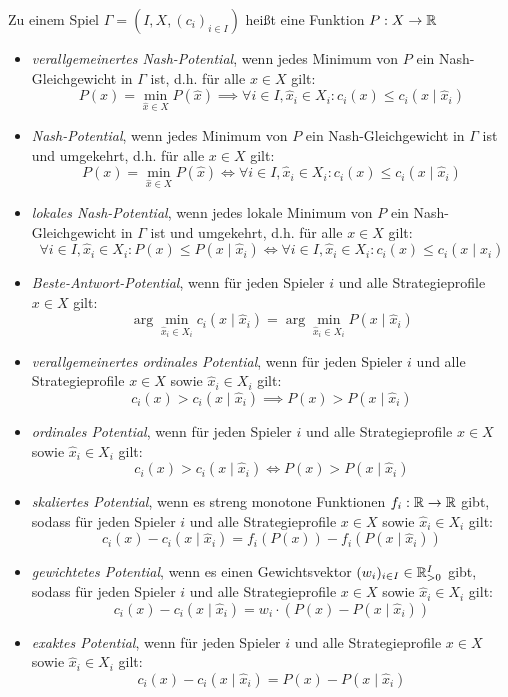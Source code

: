 \begin{defn}
	Zu einem Spiel $\Gamma = (I, X, (c_i)_{i\in I})$ heißt eine Funktion $P: X \to \mathbb{R}$
	\begin{itemize}
		\item \emph{verallgemeinertes Nash-Potential}, wenn jedes Minimum von $P$ ein Nash-Gleichgewicht in $\Gamma$ ist, d.h. für alle $x \in X$ gilt:
			\[P(x) = \min_{\hat{x} \in X}P(\hat{x}) \implies \forall i \in I, \hat{x}_i \in X_i: c_i(x) \leq c_i(x \mid \hat{x}_i) \]
		\item \emph{Nash-Potential}, wenn jedes Minimum von $P$ ein Nash-Gleichgewicht in $\Gamma$ ist und umgekehrt, d.h. für alle $x \in X$ gilt:
			\[P(x) = \min_{\hat{x} \in X}P(\hat{x}) \iff \forall i \in I, \hat{x}_i \in X_i: c_i(x) \leq c_i(x \mid \hat{x}_i) \]
		\item \emph{lokales Nash-Potential}, wenn jedes lokale Minimum von $P$ ein Nash-Gleichgewicht in $\Gamma$ ist und umgekehrt, d.h. für alle $x \in X$ gilt:
			\[\forall i \in I, \hat{x}_i \in X_i: P(x) \leq P(x \mid \hat{x}_i) \iff \forall i \in I, \hat{x}_i \in X_i: c_i(x) \leq c_i(x \mid \hat{x}_i) \]
		\item \emph{Beste-Antwort-Potential}, wenn für jeden Spieler $i$ und alle Strategieprofile $x \in X$ gilt:
			\[\arg\min_{\hat{x}_i \in X_i}c_i(x \mid \hat{x}_i) = \arg \min_{\hat{x}_i \in X_i} P(x \mid \hat{x}_i)\]
		\item \emph{verallgemeinertes ordinales Potential}, wenn für jeden Spieler $i$ und alle Strategieprofile $x \in X$ sowie $\hat{x}_i \in X_i$ gilt:
			\[c_i(x) > c_i(x \mid \hat{x}_i) \implies P(x) > P(x \mid \hat{x}_i)\]
		\item \emph{ordinales Potential}, wenn für jeden Spieler $i$ und alle Strategieprofile $x \in X$ sowie $\hat{x}_i \in X_i$ gilt:
			\[c_i(x) > c_i(x \mid \hat{x}_i) \iff P(x) > P(x \mid \hat{x}_i)\]
		\item \emph{skaliertes Potential}, wenn es streng monotone Funktionen $f_i: \mathbb{R} \to \mathbb{R}$ gibt, sodass für jeden Spieler $i$ und alle Strategieprofile $x \in X$ sowie $\hat{x}_i \in X_i$ gilt:
			\[c_i(x) - c_i(x \mid \hat{x}_i) = f_i(P(x)) - f_i(P(x \mid \hat{x}_i))\]
		\item \emph{gewichtetes Potential}, wenn es einen Gewichtsvektor $(w_i)_{i\in I} \in \mathbb{R}_{>0}^I$ gibt, sodass für jeden Spieler $i$ und alle Strategieprofile $x \in X$ sowie $\hat{x}_i \in X_i$ gilt:
			\[c_i(x) - c_i(x \mid \hat{x}_i) = w_i\cdot(P(x) - P(x \mid \hat{x}_i))\]
		\item \emph{exaktes Potential}, wenn für jeden Spieler $i$ und alle Strategieprofile $x \in X$ sowie $\hat{x}_i \in X_i$ gilt:
			\[c_i(x) - c_i(x \mid \hat{x}_i) = P(x) - P(x \mid \hat{x}_i)\]
	\end{itemize}
\end{defn}

